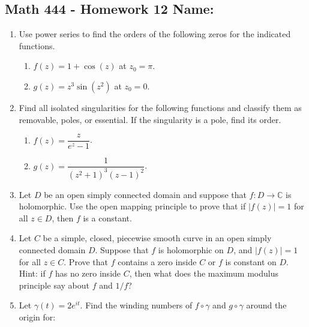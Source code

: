 \documentclass[11pt]{article}
\newcommand{\C}{\mathbb{C}}
\begin{document}
\pagestyle{empty}
\subsection*{Math 444 - Homework 12 \hfill Name: \underline{\hspace*{2in}}}
\noindent
\begin{enumerate}
\item Use power series to find the orders of the following zeros for the indicated functions.
\begin{multicols}{2}
\begin{enumerate}
\item $f(z) = 1 + \cos(z)$ at $z_0 = \pi$.

\item $g(z) = z^3\sin(z^2)$ at $z_0 = 0$. 
\end{enumerate}
\end{multicols}
\vfill


\item Find all isolated singularities for the following functions and classify them as removable, poles, or essential.  If the singularity is a pole, find its order. 
\begin{multicols}{2}
\begin{enumerate}
\item $f(z) = \dfrac{z}{e^z - 1}$.

\item $g(z) = \dfrac{1}{(z^2 + 1)^3 (z-1)^2}$. 
\end{enumerate}
\end{multicols}
\vfill

\item Let $D$ be an open simply connected domain and suppose that $f: D \rightarrow \C$ is holomorphic.  Use the open mapping principle to prove that if $|f(z)| = 1$ for all $z \in D$, then $f$ is a constant. 
\vfill

\item Let $C$ be a simple, closed, piecewise smooth curve in an open simply connected domain $D$.  Suppose that $f$ is holomorphic on $D$, and $|f(z)| = 1$ for all $z \in C$.  Prove that $f$ contains a zero inside $C$ or $f$ is constant on $D$.  Hint: if $f$ has no zero inside $C$, then what does the maximum modulus principle say about $f$ and $1/f$? 
\vfill


\newpage 
\item Let $\gamma(t) = 2 e^{it}$.  Find the winding numbers of $f \circ \gamma$ and $g \circ \gamma$ around the origin for: 


\end{enumerate}
\end{document}
